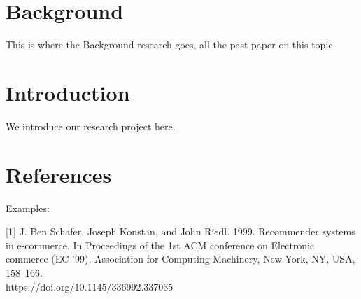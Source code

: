 \documentclass[sigconf]{acmart}
\begin{document}
 
 
\keywords{}
 
\maketitle
 
\section{Background}
This is where the Background research goes, all the past paper on this topic
 
\section{Introduction}
 We introduce our research project here.

\section{References}
 
Examples:

[1] J. Ben Schafer, Joseph Konstan, and John Riedl. 1999. Recommender systems in e-commerce. In Proceedings of the 1st ACM conference on Electronic commerce (EC '99). Association for Computing Machinery,
New York, NY, USA, 158–166.\\
https://doi.org/10.1145/336992.337035
 
\end{document}
